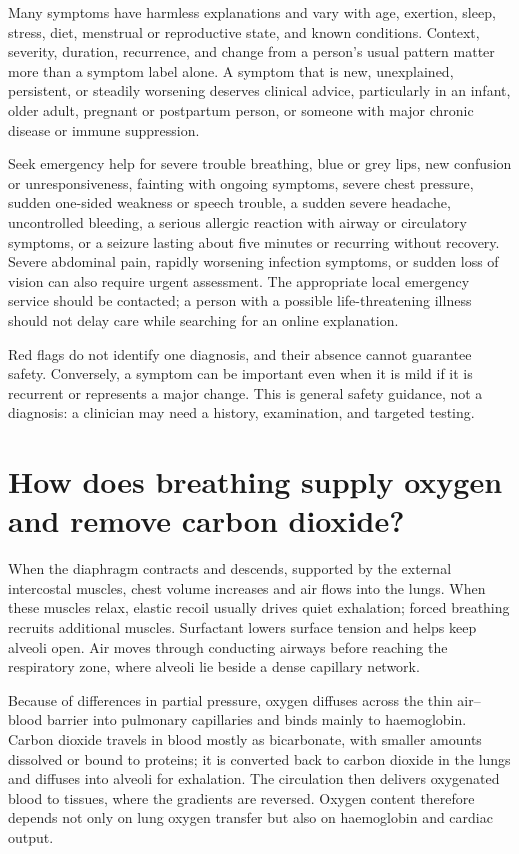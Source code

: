 \documentclass[11pt,oneside]{report}
\begin{document}
Many symptoms have harmless explanations and vary with age, exertion, sleep,
stress, diet, menstrual or reproductive state, and known conditions. Context,
severity, duration, recurrence, and change from a person's usual pattern matter
more than a symptom label alone. A symptom that is new, unexplained, persistent,
or steadily worsening deserves clinical advice, particularly in an infant,
older adult, pregnant or postpartum person, or someone with major chronic
disease or immune suppression.

Seek emergency help for severe trouble breathing, blue or grey lips, new
confusion or unresponsiveness, fainting with ongoing symptoms, severe chest
pressure, sudden one-sided weakness or speech trouble, a sudden severe
headache, uncontrolled bleeding, a serious allergic reaction with airway or
circulatory symptoms, or a seizure lasting about five minutes or recurring
without recovery. Severe abdominal pain, rapidly worsening infection symptoms,
or sudden loss of vision can also require urgent assessment. The appropriate
local emergency service should be contacted; a person with a possible
life-threatening illness should not delay care while searching for an online
explanation.

Red flags do not identify one diagnosis, and their absence cannot guarantee
safety. Conversely, a symptom can be important even when it is mild if it is
recurrent or represents a major change. This is general safety guidance, not a
diagnosis: a clinician may need a history, examination, and targeted testing.

\section{How does breathing supply oxygen and remove carbon dioxide?}

When the diaphragm contracts and descends, supported by the external
intercostal muscles, chest volume increases and air flows into the lungs. When
these muscles relax, elastic recoil usually drives quiet exhalation; forced
breathing recruits additional muscles. Surfactant lowers surface tension and
helps keep alveoli open. Air moves through conducting airways before reaching
the respiratory zone, where alveoli lie beside a dense capillary network.

Because of differences in partial pressure, oxygen diffuses across the thin
air--blood barrier into pulmonary capillaries and binds mainly to haemoglobin.
Carbon dioxide travels in blood mostly as bicarbonate, with smaller amounts
dissolved or bound to proteins; it is converted back to carbon dioxide in the
lungs and diffuses into alveoli for exhalation. The circulation then delivers
oxygenated blood to tissues, where the gradients are reversed. Oxygen content
therefore depends not only on lung oxygen transfer but also on haemoglobin and
cardiac output.
\end{document}
